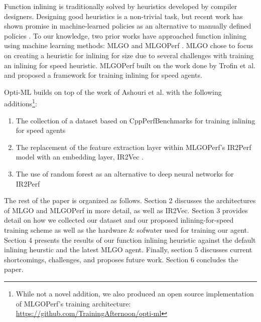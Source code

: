 \documentclass[nohyperref]{article}
\theoremstyle{plain}
\theoremstyle{definition}
\theoremstyle{remark}
\begin{document}
Function inlining is traditionally solved by heuristics developed by compiler designers. Designing good heuristics is a non-trivial task, but recent work has shown promise in machine-learned policies as an alternative to manually defined policies \cite{mlgo}. To our knowledge, two prior works have approached function inlining using machine learning methods: MLGO \cite{mlgo} and MLGOPerf \cite{mlgoperf}. MLGO chose to focus on creating a heuristic for inlining for size due to several challenges with training an inlining for speed heuristic. MLGOPerf built on the work done by Trofin et al. and proposed a framework for training inlining for speed agents.

Opti-ML builds on top of the work of Ashouri et al. with the following additions\footnote{While not a novel addition, we also produced an open source implementation of MLGOPerf's training architecture: \href{https://github.com/TrainingAfternoon/opti-ml}{https://github.com/TrainingAfternoon/opti-ml}}:
\begin{enumerate}
    \item The collection of a dataset based on CppPerfBenchmarks \cite{cpp-perf-benchmarks} for training inlining for speed agents
    \item The replacement of the feature extraction layer within MLGOPerf's IR2Perf model with an embedding layer, IR2Vec \cite{ir2vec}. %
    \item The use of random forest as an alternative to deep neural networks for IR2Perf
\end{enumerate}

The rest of the paper is organized as follows. Section 2 discusses the architectures of MLGO and MLGOPerf in more detail, as well as IR2Vec. Section 3 provides detail on how we collected our dataset and our proposed inlining-for-speed training scheme as well as the hardware \& sofwater used for training our agent. Section 4 presents the results of our function inlining heuristic against the default inlining heurstic and the latest MLGO agent. Finally, section 5 discusses current shortcomings, challenges, and proposes future work. Section 6 concludes the paper.
\end{document}
